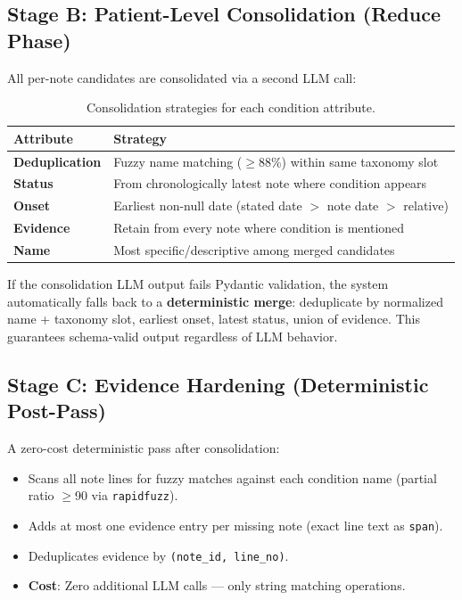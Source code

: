 \documentclass[11pt, a4paper]{article}
\begin{document}
\subsection{Stage B: Patient-Level Consolidation (Reduce Phase)}

All per-note candidates are consolidated via a second LLM call:

\begin{table}[H]
\centering
\caption{Consolidation strategies for each condition attribute.}
\begin{tabular}{ll}
\toprule
\textbf{Attribute} & \textbf{Strategy} \\
\midrule
\textbf{Deduplication} & Fuzzy name matching ($\geq$88\%) within same taxonomy slot \\
\textbf{Status} & From chronologically latest note where condition appears \\
\textbf{Onset} & Earliest non-null date (stated date $>$ note date $>$ relative) \\
\textbf{Evidence} & Retain from every note where condition is mentioned \\
\textbf{Name} & Most specific/descriptive among merged candidates \\
\bottomrule
\end{tabular}
\end{table}

\begin{keyinsight}
If the consolidation LLM output fails Pydantic validation, the system automatically falls back to a \textbf{deterministic merge}: deduplicate by normalized name + taxonomy slot, earliest onset, latest status, union of evidence. This guarantees schema-valid output regardless of LLM behavior.
\end{keyinsight}

\subsection{Stage C: Evidence Hardening (Deterministic Post-Pass)}

A zero-cost deterministic pass after consolidation:

\begin{itemize}[leftmargin=1.2em, itemsep=2pt]
  \item Scans all note lines for fuzzy matches against each condition name (partial ratio $\geq$90 via \texttt{rapidfuzz}).
  \item Adds at most one evidence entry per missing note (exact line text as \texttt{span}).
  \item Deduplicates evidence by \texttt{(note\_id, line\_no)}.
  \item \textbf{Cost}: Zero additional LLM calls --- only string matching operations.
\end{itemize}
\end{document}
